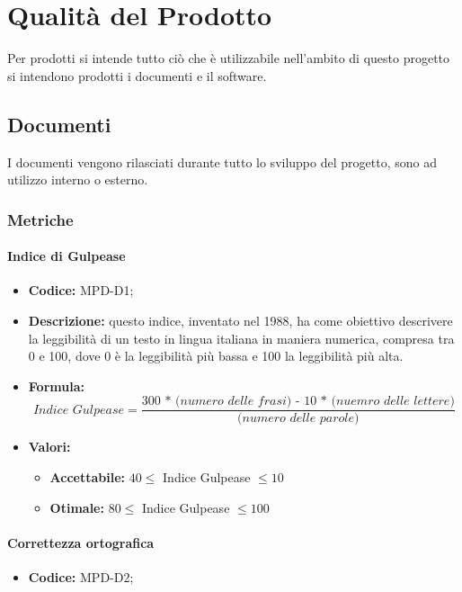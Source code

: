 \section{Qualità del Prodotto}
Per prodotti si intende tutto ciò che è utilizzabile nell'ambito di questo progetto si intendono prodotti i documenti e il software.

\subsection{Documenti}
I documenti vengono rilasciati durante tutto lo sviluppo del progetto, sono ad utilizzo interno o esterno.

\subsubsection{Metriche}

 
    \paragraph{Indice di Gulpease}
\begin{itemize}
\item \textbf{Codice:} MPD-D1;
\item \textbf{Descrizione:} questo indice, inventato nel 1988, ha come obiettivo descrivere la leggibilità di un testo in lingua italiana in maniera numerica, compresa tra 0 e 100, dove 0 è la leggibilità più bassa e 100 la leggibilità più alta. 
\item \textbf{Formula:} \[\textit{Indice Gulpease} = \frac{\textit{300 * (numero delle frasi) - 10 * (nuemro delle lettere)}}{\textit{(numero delle parole)}}\]
\item \textbf{Valori:}
    \begin{itemize}
        \item \textbf{Accettabile:} $40 \leq$ Indice Gulpease $\leq 10$
        \item \textbf{Otimale:} $80 \leq$ Indice Gulpease $\leq 100$
    \end{itemize}

   
\end{itemize}

\paragraph{Correttezza ortografica}
\begin{itemize}
    \item \textbf{Codice:} MPD-D2;
\end{itemize}

